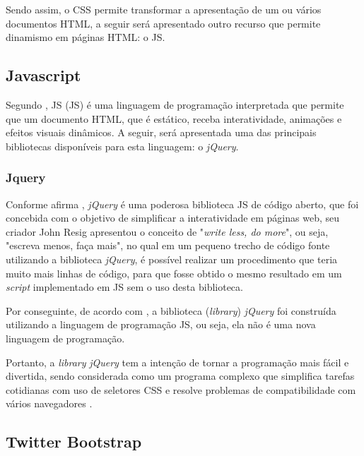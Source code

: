 Sendo assim, o \acs{CSS} permite transformar a apresentação de um ou vários
documentos \acs{HTML}, a seguir será apresentado outro recurso que permite
dinamismo em páginas \acs{HTML}: o \acl{JS}.

\subsection{Javascript}

Segundo , \acl{JS} (\acs{JS}) é
uma linguagem de programação interpretada que permite que um documento
\acs{HTML}, que é estático, receba interatividade, animações e efeitos visuais
dinâmicos. A seguir, será apresentada uma das principais bibliotecas disponíveis
para esta linguagem: o \textit{jQuery}.

\subsubsection{Jquery}

Conforme afirma , 
\textit{jQuery} é uma poderosa biblioteca \acl{JS} de código aberto, que foi
concebida com o objetivo de simplificar a interatividade em páginas web, seu 
criador John Resig apresentou o conceito de "\textit{write less, do more}", ou
seja, "escreva menos, faça mais", no qual em um pequeno trecho de código fonte 
utilizando a biblioteca \textit{jQuery}, é possível realizar um procedimento que
teria muito mais linhas de código, para que fosse obtido o mesmo resultado em um
\textit{script} implementado em \acs{JS} sem o uso desta biblioteca.

Por conseguinte, de acordo com , a biblioteca
(\textit{library}) \textit{jQuery} foi construída utilizando a linguagem de 
programação \acl{JS}, ou seja, ela não é uma nova linguagem de programação.

Portanto, a \textit{library} \textit{jQuery} tem a intenção de tornar a
programação mais fácil e divertida, sendo considerada como um programa complexo
que simplifica tarefas cotidianas com uso de seletores \acs{CSS} e resolve
problemas de compatibilidade com vários navegadores 
\cite{javascriptAndJQueryTheMissingManual}.

\subsection{Twitter Bootstrap}

